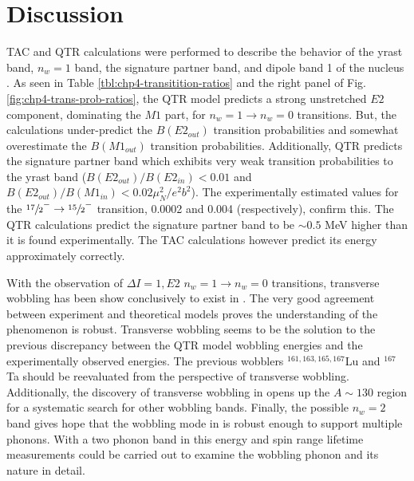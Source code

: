 \section{Discussion}
\label{sec:trw-discussion}
TAC and QTR calculations were performed to describe the behavior of the yrast band, $n_w=1$ band, the signature partner band, and dipole band 1 of the nucleus \pr{}. As seen in Table \ref{tbl:chp4-transitition-ratios} and the right panel of Fig. \ref{fig:chp4-trans-prob-ratios}, the QTR model predicts a strong unstretched $E2$ component, dominating the $M1$ part, for $n_w=1\rightarrow{}n_w=0$ transitions. But, the calculations under-predict the $B(E2_{out})$ transition probabilities and somewhat overestimate the $B(M1_{out})$ transition probabilities. Additionally, QTR predicts the signature partner band which exhibits very weak transition probabilities to the yrast band ($B(E2_{out})/B(E2_{in})<0.01$ and $B(E2_{out})/B(M1_{in})<0.02\mu^2_N/e^2b^2$). The experimentally estimated values for the $\sfrac{17}{2}^-\rightarrow\sfrac{15}{2}^-$ transition, 0.0002 and 0.004 (respectively), confirm this. The QTR calculations predict the signature partner band to be $\sim{}0.5$ MeV higher than it is found experimentally. The TAC calculations however predict its energy approximately correctly.

With the observation of $\Delta{}I=1, E2$ $n_w=1\rightarrow{}n_w=0$ transitions, transverse wobbling has been show conclusively to exist in \pr{}. The very good agreement between experiment and theoretical models proves the understanding of the phenomenon is robust. Transverse wobbling seems to be the solution to the previous discrepancy between the QTR model wobbling energies \cite{oldQTRWobblingTheory1,oldQTRWobblingTheory2,oldQTRWobblingTheory3,oldQTRWobblingTheory4} and the experimentally observed energies. The previous wobblers $^{161,163,165,167}$Lu \cite{wobblingIn163Lu,wobblingIn163LuTwoPhonon,wobblingIn165Lu,wobblingIn167Lu,wobblingIn161Lu} and $^{167}$Ta \cite{wobblingIn167Ta} should be reevaluated from the perspective of transverse wobbling. Additionally, the discovery of transverse wobbling in \pr{} opens up the $A\sim{}130$ region for a systematic search for other wobbling bands. Finally, the possible $n_w=2$ band gives hope that the wobbling mode in \pr{} is robust enough to support multiple phonons. With a two phonon band in this energy and spin range lifetime measurements could be carried out to examine the wobbling phonon and its nature in detail.
